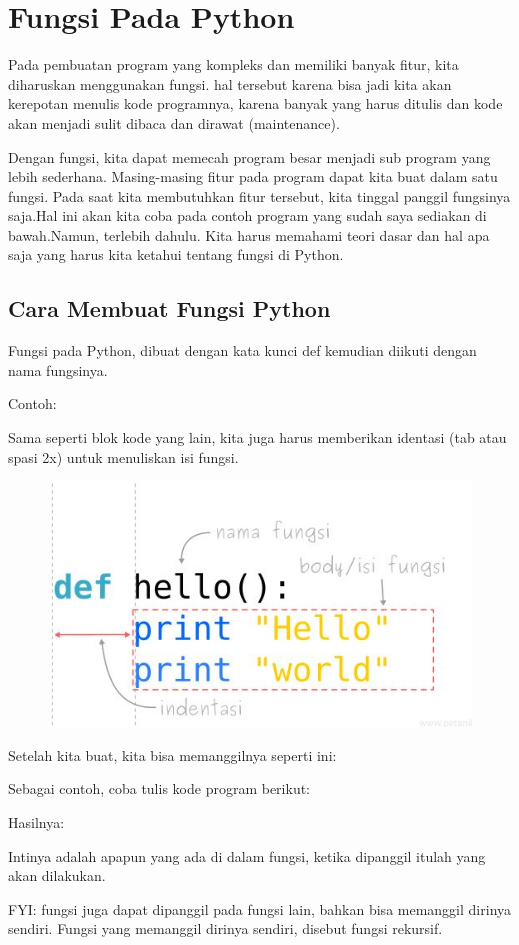 \chapter{Fungsi Pada Python}
\par Pada pembuatan program yang kompleks dan memiliki banyak fitur, kita diharuskan menggunakan fungsi. hal tersebut karena bisa jadi kita akan kerepotan menulis kode programnya, karena banyak yang harus ditulis dan kode akan menjadi sulit dibaca dan dirawat (maintenance).
\par Dengan fungsi, kita dapat memecah program besar menjadi sub program yang lebih sederhana. Masing-masing fitur pada program dapat kita buat dalam satu fungsi. Pada saat kita membutuhkan fitur tersebut, kita tinggal panggil fungsinya saja.Hal ini akan kita coba pada contoh program yang sudah saya sediakan di bawah.Namun, terlebih dahulu. Kita harus memahami teori dasar dan hal apa saja yang harus kita ketahui tentang fungsi di Python.
\section{Cara Membuat Fungsi Python}
Fungsi pada Python, dibuat dengan kata kunci def kemudian diikuti dengan nama fungsinya.

Contoh: 

 Sama seperti blok kode yang lain, kita juga harus memberikan identasi (tab atau spasi 2x) untuk menuliskan isi fungsi.
\newpage \begin{figure}[!htbp]
    \centering
    \includegraphics[scale=0.5]{figures/p2}
    \label{fungsi}
\end{figure}
\par Setelah kita buat, kita bisa memanggilnya seperti ini:

Sebagai contoh, coba tulis kode program berikut:

Hasilnya:

Intinya adalah apapun yang ada di dalam fungsi, ketika dipanggil itulah yang akan dilakukan.
\par FYI: fungsi juga dapat dipanggil pada fungsi lain, bahkan bisa memanggil dirinya sendiri. Fungsi yang memanggil dirinya sendiri, disebut fungsi rekursif.
